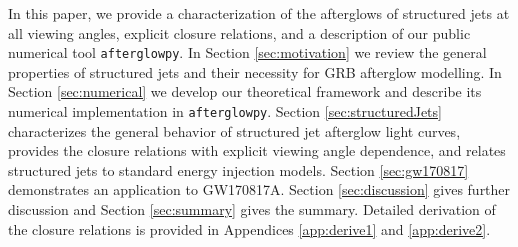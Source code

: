 \documentclass[twocolumn]{aastex62}
\newcommand{\gwbns}{GW170817A}
\newcommand{\afterglowpy}{{\tt afterglowpy}}
\begin{document}
In this paper, we provide a characterization of the afterglows of structured jets at all viewing angles, explicit closure relations, and a description of our  public numerical tool \afterglowpy{}. In Section \ref{sec:motivation} we review the general properties of structured jets and their necessity for GRB afterglow modelling.  In Section \ref{sec:numerical} we develop our theoretical framework and describe its numerical implementation in \afterglowpy{}.  Section \ref{sec:structuredJets} characterizes the general behavior of structured jet afterglow light curves, provides the closure relations with explicit viewing angle dependence, and relates structured jets to standard energy injection models.  Section \ref{sec:gw170817} demonstrates an application to \gwbns{}. Section \ref{sec:discussion} gives further discussion and Section \ref{sec:summary} gives the summary.  Detailed derivation of the closure relations is provided in Appendices \ref{app:derive1} and \ref{app:derive2}.

\end{document}
